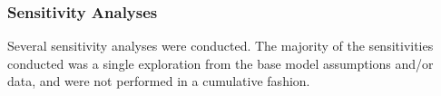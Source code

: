 \documentclass[11pt,
  english,
  a4paper,
]{article}
\begin{document}
\leavevmode\tagmcend\tagstructend\par


\hypertarget{sensitivities}{%
\subsubsection{Sensitivity Analyses}\label{sensitivities}}

\leavevmode\tagmcend\tagstructend


Several sensitivity analyses were conducted. The majority of the sensitivities conducted was a single exploration from the base model assumptions and/or data, and were not performed in a cumulative fashion.

\leavevmode\tagmcend\tagstructend\par
\end{document}
